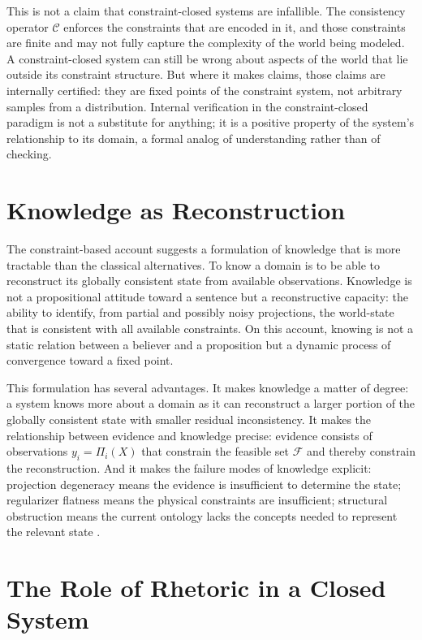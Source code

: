 \documentclass[11pt, oneside]{article}
\begin{document}
This is not a claim that constraint-closed systems are infallible. The consistency operator $\mathcal{C}$ enforces the constraints that are encoded in it, and those constraints are finite and may not fully capture the complexity of the world being modeled. A constraint-closed system can still be wrong about aspects of the world that lie outside its constraint structure. But where it makes claims, those claims are internally certified: they are fixed points of the constraint system, not arbitrary samples from a distribution. Internal verification in the constraint-closed paradigm is not a substitute for anything; it is a positive property of the system's relationship to its domain, a formal analog of understanding rather than of checking.

\section{Knowledge as Reconstruction}

The constraint-based account suggests a formulation of knowledge that is more tractable than the classical alternatives. To know a domain is to be able to reconstruct its globally consistent state from available observations. Knowledge is not a propositional attitude toward a sentence but a reconstructive capacity: the ability to identify, from partial and possibly noisy projections, the world-state that is consistent with all available constraints. On this account, knowing is not a static relation between a believer and a proposition but a dynamic process of convergence toward a fixed point.

This formulation has several advantages. It makes knowledge a matter of degree: a system knows more about a domain as it can reconstruct a larger portion of the globally consistent state with smaller residual inconsistency. It makes the relationship between evidence and knowledge precise: evidence consists of observations $y_i = \Pi_i(X)$ that constrain the feasible set $\mathcal{F}$ and thereby constrain the reconstruction. And it makes the failure modes of knowledge explicit: projection degeneracy means the evidence is insufficient to determine the state; regularizer flatness means the physical constraints are insufficient; structural obstruction means the current ontology lacks the concepts needed to represent the relevant state \cite{friston2010free}.

\section{The Role of Rhetoric in a Closed System}
\end{document}
